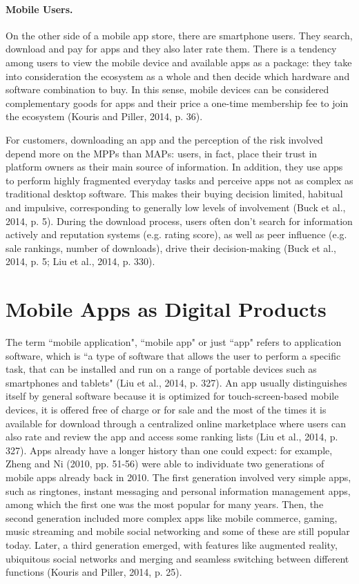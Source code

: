 \paragraph{Mobile Users.}
On the other side of a mobile app store, there are smartphone users. They search, download and pay for apps and they also later rate them. There is a tendency among users to view the mobile device and available apps as a package: they take into consideration the ecosystem as a whole and then decide which hardware and software combination to buy. In this sense, mobile devices can be considered complementary goods for apps and their price a one-time membership fee to join the ecosystem (Kouris and Piller, 2014, p. 36).

For customers, downloading an app and the perception of the risk involved depend more on the MPPs than MAPs: users, in fact, place their trust in platform owners as their main source of information. In addition, they use apps to perform highly fragmented everyday tasks and perceive apps not as complex as traditional desktop software. This makes their buying decision limited, habitual and impulsive, corresponding to generally low levels of involvement (Buck et al., 2014, p. 5). During the download process, users often don't search for information actively and reputation systems (e.g. rating score), as well as peer influence (e.g. sale rankings, number of downloads), drive their decision-making (Buck et al., 2014, p. 5; Liu et al., 2014, p. 330). 


\section{Mobile Apps as Digital Products}

The term ``mobile application", ``mobile app" or just ``app" refers to application software, which is ``a type of software that allows the user to perform a specific task, that can be installed and run on a range of portable devices such as smartphones and tablets" (Liu et al., 2014, p. 327). An app usually distinguishes itself by general software because it is optimized for touch-screen-based mobile devices, it is offered free of charge or for sale and the most of the times it is available for download through a centralized online marketplace where users can also rate and review the app and access some ranking lists (Liu et al., 2014, p. 327). Apps already have a longer history than one could expect: for example, Zheng and Ni (2010, pp. 51-56) were able to individuate two generations of mobile apps already back in 2010. The first generation involved very simple apps, such as ringtones, instant messaging and personal information management apps, among which the first one was the most popular for many years. Then, the second generation included more complex apps like mobile commerce, gaming, music streaming and mobile social networking and some of these are still popular today. Later, a third generation emerged, with features like augmented reality, ubiquitous social networks and merging and seamless switching between different functions (Kouris and Piller, 2014, p. 25). 


